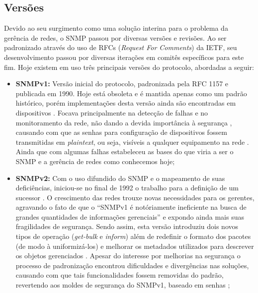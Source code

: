 \documentclass[twoside,english,brazilian]{UNISINOSmonografia}
\begin{document}
\subsection{Versões}

Devido ao seu surgimento como uma solução interina para o problema da gerência 
de redes, o SNMP passou por diversas versões e revisões.
Ao ser padronizado através do uso de RFCs (\textit{Request For Comments}) 
da IETF, seu desenvolvimento passou por diversas iterações em comitês 
específicos para este fim.
Hoje existem em uso três principais versões do protocolo, abordadas a seguir:

\begin{itemize}
\item \textbf{SNMPv1:}
Versão inicial do protocolo, padronizada pela RFC 1157 %
e publicada em 1990. 
Hoje está obsoleta e é mantida apenas como um padrão histórico, porém 
implementações desta versão ainda são encontradas em dispositivos 
\cite{Mauro2009,Ding2009}.
Focava principalmente na detecção de falhas e no monitoramento da rede, não 
dando a devida importância à segurança \cite{Clemm2006}, causando com que as 
senhas para configuração de dispositivos fossem transmitidas em 
\textit{plaintext}, ou seja, visíveis a qualquer equipamento na rede 
\cite{Hunt1997,Ding2009}.
Ainda que com algumas falhas estabeleceu as bases do que viria a ser o SNMP 
e a gerência de redes como conhecemos hoje;

\item \textbf{SNMPv2:}
Com o uso difundido do SNMP e o mapeamento de suas deficiências, iniciou-se no 
final de 1992 o trabalho para a definição de um sucessor \cite{Hunt1997}.
O crescimento das redes trouxe novas necessidades para os gerentes, agravando 
o fato de que o ``SNMPv1 é notóriamente ineficiente na busca de grandes 
quantidades de informações gerenciais'' \cite{Clemm2006} e expondo ainda mais 
suas fragilidades de segurança.
Sendo assim, esta versão introduziu dois novos tipos de operação
(\textit{get-bulk} e \textit{inform}) %
além de redefinir o formato dos pacotes (de modo à uniformizá-los) e melhorar 
os metadados utilizados para descrever os objetos gerenciados 
\cite{Hunt1997,stallings1999snmp,Mauro2009}. 
Apesar do interesse por melhorias na segurança o processo de padronização 
encontrou dificuldades e divergências nas soluções, causando com que tais 
funcionalidades fossem removidas do padrão, revertendo aos moldes de segurança 
do SNMPv1, baseado em senhas \cite{Clemm2006,Ding2009};


\end{itemize}
\end{document}
